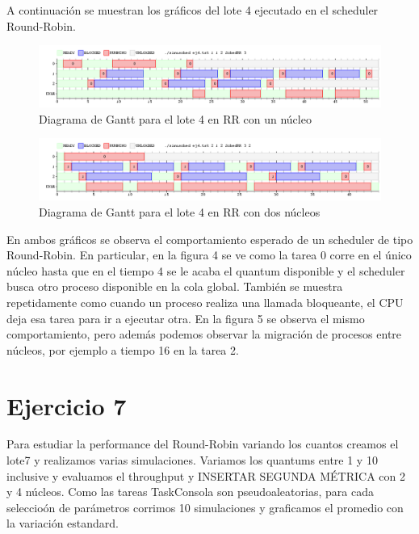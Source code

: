 \documentclass{article}
\begin{document}
  A continuaci\'on se muestran los gr\'aficos del lote 4 ejecutado en el scheduler Round-Robin.
  \begin{figure}[htb]
  \includegraphics[scale=0.32]{ej4_1.png}
  \caption{Diagrama de Gantt para el lote 4 en RR con un n\'ucleo}
  \end{figure}
  \begin{figure}[htb]
  \includegraphics[scale=0.32]{ej4_2.png}
  \caption{Diagrama de Gantt para el lote 4 en RR con dos n\'ucleos}
  \end{figure}
  
  En ambos gr\'aficos se observa el comportamiento esperado de un scheduler de tipo Round-Robin. En particular, en la figura 4 se ve como la tarea 0 corre en el \'unico n\'ucleo hasta que en el tiempo 4 se le acaba
  el quantum disponible y el scheduler busca otro proceso disponible en la cola global. Tambi\'en se muestra repetidamente como cuando un proceso realiza una llamada bloqueante, el CPU deja esa tarea para ir a ejecutar
  otra. En la figura 5 se observa el mismo comportamiento, pero adem\'as podemos observar la migraci\'on de procesos entre n\'ucleos, por ejemplo a tiempo 16 en la tarea 2.
  
  \section{Ejercicio 7}
  
  Para estudiar la performance del Round-Robin variando los cuantos creamos el lote7 y realizamos varias simulaciones. Variamos los quantums entre 1 y 10 inclusive y evaluamos el throughput y INSERTAR SEGUNDA M\'ETRICA con 2 y 4 n\'ucleos. Como las tareas TaskConsola son pseudoaleatorias,
  para cada seleccio\'on de par\'ametros corrimos 10 simulaciones y graficamos el promedio con la variaci\'on estandard.
  
\end{document}
